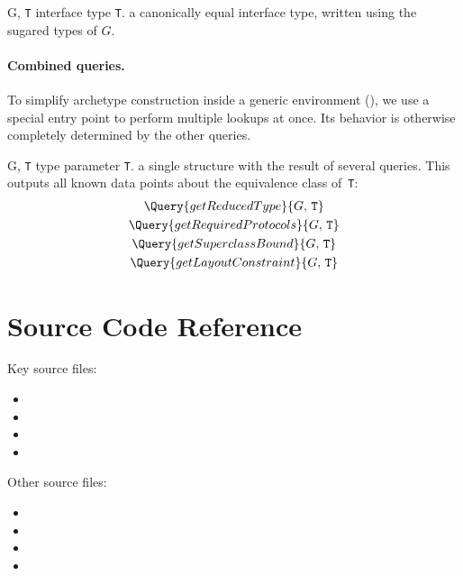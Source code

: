 \documentclass[../generics]{subfiles}
\begin{document}
\begin{itemize}
{G, \texttt{T}}
{interface type \texttt{T}.}
{a canonically equal interface type, written using the sugared types of $G$.}
{}
\end{itemize}

\paragraph{Combined queries.} To simplify archetype construction inside a generic environment (), we use a special entry point to perform multiple lookups at once. Its behavior is otherwise completely determined by the other queries.

\begin{itemize}
{G, \texttt{T}}
{type parameter \texttt{T}.}
{a single structure with the result of several queries.}
{This outputs all known data points about the equivalence class of~\texttt{T}:
\begin{gather*}
\Query{getReducedType}{G,\,\texttt{T}}\\
\Query{getRequiredProtocols}{G,\,\texttt{T}}\\
\Query{getSuperclassBound}{G,\,\texttt{T}}\\
\Query{getLayoutConstraint}{G,\,\texttt{T}}
\end{gather*}}
\end{itemize}

\section{Source Code Reference}\label{genericsigsourceref}

Key source files:
\begin{itemize}
\item {}
\item {}
\item {}
\item {}
\end{itemize}
Other source files:
\begin{itemize}
\item {}
\item {}
\item {}
\item {}
\end{itemize}
\end{document}
